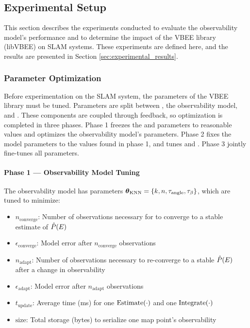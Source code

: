 \subsection{Experimental Setup}

This section describes the experiments conducted to evaluate the observability model's performance and to determine the impact of the VBEE library (libVBEE) on SLAM systems. These experiments are defined here, and the results are presented in Section \ref{sec:experimental_results}.

\subsubsection{Parameter Optimization}

Before experimentation on the SLAM system, the parameters of the VBEE library must be tuned. Parameters are split between \vbee, the observability model, and \epe. These components are coupled through feedback, so optimization is completed in three phases. Phase 1 freezes the \vbee{} and \epe{} parameters to reasonable values and optimizes the observability model’s parameters. Phase 2 fixes the model parameters to the values found in phase 1, and tunes \vbee{} and \epe. Phase 3 jointly fine-tunes all parameters.

\paragraph{Phase 1 — Observability Model Tuning}

The observability model has parameters \(\boldsymbol{\theta}_{\text{KNN}} = \{k, n, \tau_{\text{angle}}, \tau_{\text{\ensuremath{\beta}}}\}\), which are tuned to minimize:

\begin{itemize}
    \item \(n_{\text{converge}}\): Number of observations necessary for \vbee{} to converge to a stable estimate of \(\hat{P}(E)\)
    \item \(\epsilon_{\text{converge}}\): Model error after \(n_{\text{converge}}\) observations
    \item \(n_{\text{adapt}}\): Number of observations necessary to re-converge to a stable \(\hat{P}(E)\) after a change in observability
    \item \(\epsilon_{\text{adapt}}\): Model error after \(n_{\text{adapt}}\) observations
    \item \(t_{\text{update}}\): Average time (ms) for one \(\operatorname{Estimate}(\cdot)\) and one \(\operatorname{Integrate}(\cdot)\)
    \item \(\text{size}\): Total storage (bytes) to serialize one map point’s observability
\end{itemize}

